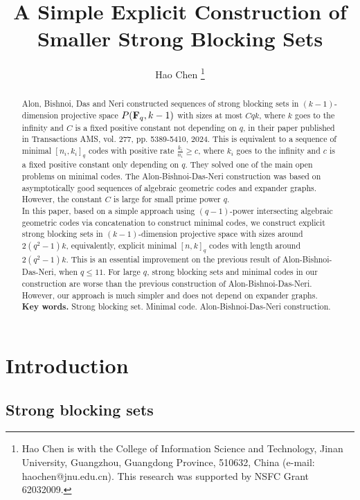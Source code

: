 \documentclass[12pt]{article}
\title{\bf A Simple Explicit Construction of Smaller Strong Blocking Sets}
\author{Hao Chen \thanks{Hao Chen is with the College of Information Science and Technology, Jinan University, Guangzhou, Guangdong Province, 510632, China (e-mail: haochen@jnu.edu.cn). This research was supported by NSFC Grant 62032009.}}
\begin{document}
	
	\maketitle
	\begin{abstract}
		Alon, Bishnoi, Das and Neri constructed sequences of strong blocking sets in $(k-1)$-dimension projective space $P({\bf F}_q, k-1)$ with sizes at most $Cqk$, where $k$ goes to the infinity and $C$ is a fixed positive constant not depending on $q$, in their paper published in Transactions AMS, vol. 277, pp. 5389-5410, 2024. This is equivalent to a sequence of minimal $[n_i,k_i]_q$ codes with positive rate $\frac{k_i}{n_i} \geq c$, where $k_i$ goes to the infinity and $c$ is a fixed positive constant only depending on $q$. They solved one of the main open problems on minimal codes. The Alon-Bishnoi-Das-Neri construction was based on asymptotically good sequences of algebraic geometric codes and expander graphs. However, the constant $C$ is large for small prime power $q$. \\

In this paper, based on a simple approach using $(q-1)$-power intersecting algebraic geometric codes via concatenation to construct minimal codes, we construct explicit strong blocking sets in $(k-1)$-dimension projective space with sizes around $2(q^2-1)k$, equivalently, explicit minimal $[n,k]_q$ codes with length around $2(q^2-1)k$. This is an essential improvement on the previous result of Alon-Bishnoi-Das-Neri, when $q \leq 11$. For large $q$, strong blocking sets and minimal codes in our construction are worse than the previous construction of Alon-Bishnoi-Das-Neri. However, our approach is much simpler and does not depend on expander graphs.\\


		{\bf Key words.} Strong blocking set. Minimal code. Alon-Bishnoi-Das-Neri construction.
	\end{abstract}
	
	\newpage


\section{Introduction}


\subsection{Strong blocking sets}
\end{document}
